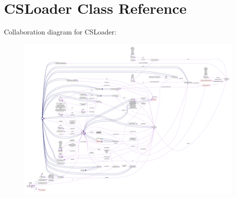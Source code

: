 \hypertarget{classCSLoader}{}\section{C\+S\+Loader Class Reference}
\label{classCSLoader}


Collaboration diagram for C\+S\+Loader\+:
\nopagebreak
\begin{figure}[H]
\begin{center}
\leavevmode
\includegraphics[width=350pt]{classCSLoader__coll__graph}
\end{center}
\end{figure}
